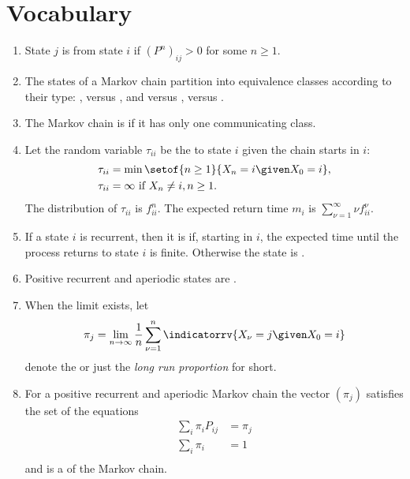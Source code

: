 \documentclass[12pt]{article}
\begin{document}
\section*{Vocabulary}
\begin{enumerate}
    \item
        State \( j \) is  from state \( i \) if \( (P^{n})_
        {ij} > 0 \) for some \( n \ge 1 \).
    \item
        The states of a Markov chain partition into equivalence classes
        according to their type:  , 
        versus , and  versus
        ,  versus .
    \item
        The Markov chain is  if it has only one
        communicating class.
    \item
        Let the random variable \( \tau_{ii} \) be the 
        to state \( i \) given the chain starts in \( i \):
        \begin{align*}
            \tau_{ii} &= \min\setof{n \ge 1}{X_n = i \given X_0 = i}, \\
            \tau_{ii} &= \infty \text{ if } X_n \ne i, n \ge 1.
        \end{align*}
        The distribution of \( \tau_{ii} \) is \( f^n_{ii} \). The 
        {expected return time} \( m_i \) is \( \sum_ {\nu=1}^\infty \nu
        f^\nu_{ii} \).
    \item
        If a state \( i \) is recurrent, then it is  if, starting in \( i \), the expected time until the
        process returns to state \( i \) is finite.  Otherwise the state
        is .
    \item
        Positive recurrent and aperiodic states are .
    \item
        When the limit exists, let
        \[
            \pi_j = \lim_{n \to \infty} \frac{1}{n} \sum\limits_{\nu=1}^n
            \indicatorrv{X_{\nu}= j \given X_0 = i}
        \] denote the  or just the \emph{long run proportion} for
        short.
    \item
        For a positive recurrent and aperiodic Markov chain the vector \(
        (\pi_j) \) satisfies the set of the equations
        \begin{align*}
            \sum\limits_{i} \pi_{i} P_{ij} &= \pi_{j}\\
            \sum\limits_{i} \pi_{i} &= 1 \\
        \end{align*}
        and is a  of the
        Markov chain.
\end{enumerate}
\end{document}
